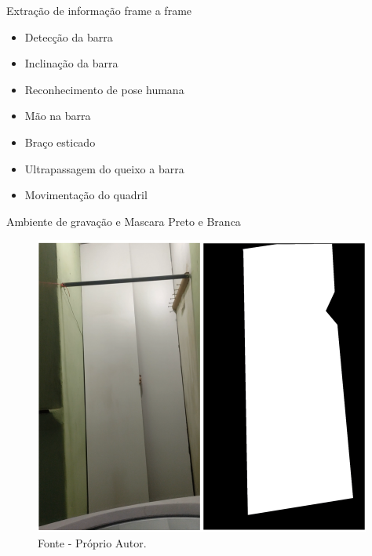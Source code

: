 

\begin{frame}{Extração de informação frame a frame}
    \begin{itemize}
        \item  Detecção da barra 
        \item  Inclinação da barra
        \item  Reconhecimento de pose humana 
        \item  Mão na barra 
        \item  Braço esticado
        \item  Ultrapassagem do queixo a barra
        \item  Movimentação do quadril
    \end{itemize}
\end{frame}







\begin{frame}{Ambiente de gravação e Mascara Preto e Branca}
    \begin{figure}[!ht]
    \centering
    \includegraphics[scale=0.55]{img/desenvolvimento/preAction/mascara.png}
    \caption*{Fonte - Próprio Autor.}
    \end{figure}
\end{frame}


